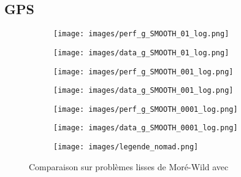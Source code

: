 	\subsection{GPS}
	\begin{figure}[!htb] %
		\centering
		\begin{subfigure}{0.43\textwidth}
			\texttt{[image: images/perf\_g\_SMOOTH\_01\_log.png]}
		\end{subfigure}%
		\begin{subfigure}{0.43\textwidth}
			\texttt{[image: images/data\_g\_SMOOTH\_01\_log.png]}
		\end{subfigure}
		\smallskip
		\begin{subfigure}{0.43\textwidth}
			\texttt{[image: images/perf\_g\_SMOOTH\_001\_log.png]}
		\end{subfigure}%
		\begin{subfigure}{0.43\textwidth}
			\texttt{[image: images/data\_g\_SMOOTH\_001\_log.png]}
		\end{subfigure}
		\smallskip
		\begin{subfigure}{0.43\textwidth}
			\texttt{[image: images/perf\_g\_SMOOTH\_0001\_log.png]}
		\end{subfigure}%
		\begin{subfigure}{0.43\textwidth}
			\texttt{[image: images/data\_g\_SMOOTH\_0001\_log.png]}
		\end{subfigure}
		\smallskip
		\begin{subfigure}{0.95\textwidth}
			\texttt{[image: images/legende\_nomad.png]}
		\end{subfigure}
		\caption{Comparaison sur problèmes lisses de Moré-Wild avec \CS} \label{fig:1}
	\end{figure}
	\clearpage
